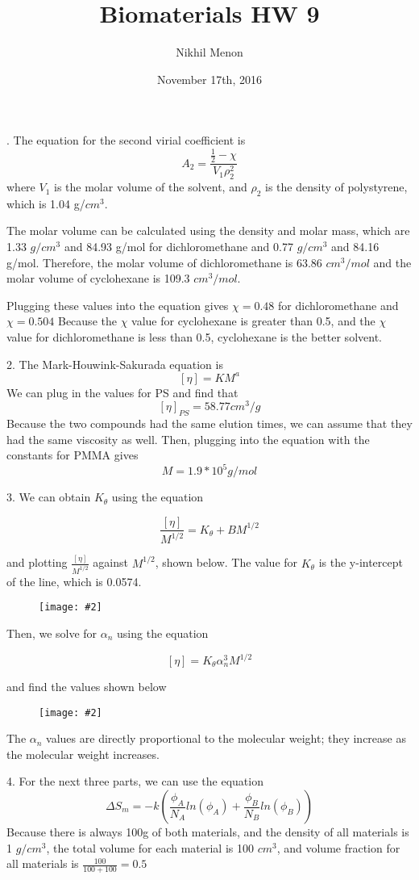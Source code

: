 \documentclass{article}
\title{Biomaterials HW 9}
\author{Nikhil Menon}
\date{November 17th, 2016}
\newcommand{\makefig}[2]{
\begin{figure}[h]
\centering
\texttt{[image: \#2]}
\end{figure}
}
\begin{document}
. The equation for the second virial coefficient is
$$A_2=\frac{\frac{1}{2}-\chi}{V_1\rho_2^2}$$
where $V_1$ is the molar volume of the solvent, and $\rho_2$ is the density of polystyrene, which is 1.04 g/$cm^3$.

The molar volume can be calculated using the density and molar mass, which are 1.33 $g/cm^3$ and 84.93 g/mol for dichloromethane and 0.77 $g/cm^3$ and 84.16 g/mol. Therefore, the molar volume of dichloromethane is 63.86 $cm^3/mol$ and the molar volume of cyclohexane is 109.3 $cm^3/mol$.

Plugging these values into the equation gives $\chi=0.48$ for dichloromethane and $\chi=0.504$ Because the $\chi$ value for cyclohexane is greater than 0.5, and the $\chi$ value for dichloromethane is less than 0.5, cyclohexane is the better solvent.

2. The Mark-Houwink-Sakurada equation is
$$[\eta]=KM^a$$
We can plug in the values for PS and find that
$$[\eta]_{PS}=58.77 cm^3/g$$
Because the two compounds had the same elution times, we can assume that they had the same viscosity as well. Then, plugging into the equation with the constants for PMMA gives
$$M=1.9*10^5 g/mol$$

3. We can obtain $K_{\theta}$ using the equation

$$\frac{[\eta]}{M^{1/2}}=K_{\theta}+BM^{1/2}$$

and plotting $\frac{[\eta]}{M^{1/2}}$ against $M^{1/2}$, shown below. The value for $K_{\theta}$ is the y-intercept of the line, which is 0.0574.
\makefig{0.5}{P3.png}

Then, we solve for $\alpha_n$ using the equation

$$[\eta]=K_{\theta}\alpha^3_n M^{1/2}$$

and find the values shown below
\makefig{0.5}{P3b.png}

The $\alpha_n$ values are directly proportional to the molecular weight; they increase as the molecular weight increases.

4. For the next three parts, we can use the equation
$$\Delta S_m = -k\left(\frac{\phi_A}{N_A}ln(\phi_A)+\frac{\phi_B}{N_B}ln(\phi_B)\right)$$
Because there is always 100g of both materials, and the density of all materials is 1 $g/cm^3$, the total volume for each material is 100 $cm^3$, and volume fraction for all materials is $\frac{100}{100+100}=0.5$
\end{document}
